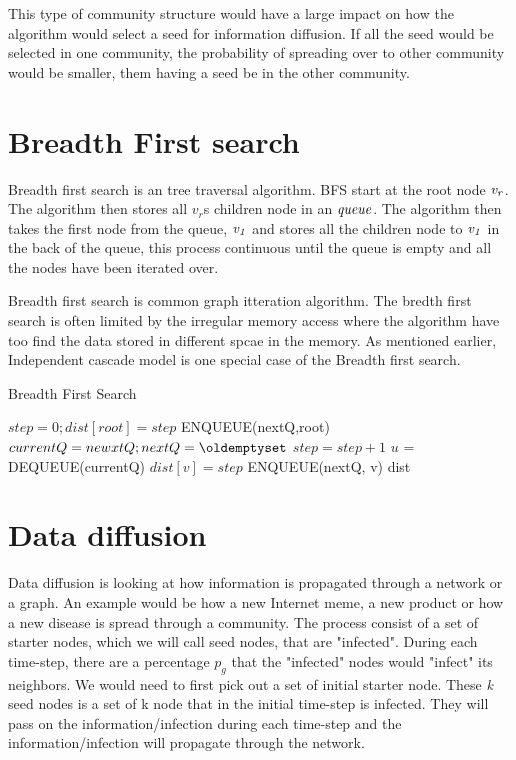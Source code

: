 This type of community structure would have a large impact on how the algorithm would select a seed for information diffusion. If all the seed would be selected in one community, the probability of spreading over to other community would be smaller, them having a seed be in the other community.

\section{Breadth First search}
Breadth first search is an tree traversal algorithm. BFS start at the root node $\it{v_r}$. The algorithm then stores all $v_r$s children node in an $\it{queue}$. The algorithm then takes the first node from the queue, $\it{v_1}$ and stores all the children node to $\it{v_1}$ in the back of the queue, this process continuous until the queue is empty and all the nodes have been iterated over. 

Breadth first search is common graph itteration algorithm. The bredth first search is often limited by the irregular memory access where the algorithm have too find the data stored in different spcae in the memory. As mentioned earlier, Independent cascade model is one special case of the Breadth first search.

\begin{algorithm}
\caption{Breadth First Search}
\begin{algorithmic}[1]
\State $step = 0; dist[root] = step$
\State ENQUEUE(nextQ,root)
\State $currentQ = newxtQ; nextQ = \oldemptyset$
\State $step = step+1$
\State$ u$ = DEQUEUE(currentQ)
\State $dist[v] = step$
\State ENQUEUE(nextQ, v)
\EndIf
\EndFor
\EndWhile
\EndWhile
\Return dist
\end{algorithmic}
\end{algorithm}


\section{Data diffusion}
Data diffusion is looking at how information is propagated through a network or a graph. An example would be how a new Internet meme, a new product or how a new disease is spread through a community. The process consist of a set of starter nodes, which we will call seed nodes, that are "infected". During each time-step, there are a percentage $p_g$ that the "infected" nodes would "infect" its neighbors. We would need to first pick out a set of initial starter node. These {\it k} seed nodes is a set of k node that in the initial time-step is infected. They will pass on the information/infection during each time-step and the information/infection will propagate through the network. 
 
